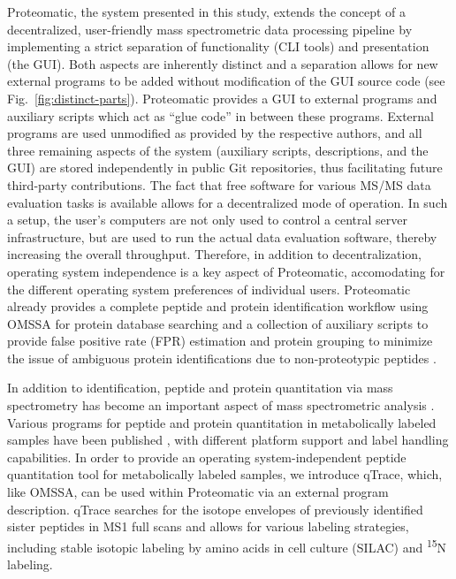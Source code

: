 Proteomatic, the system presented in this study, extends the concept of a 
decentralized, user-friendly mass spectrometric data processing pipeline by 
implementing a strict separation of functionality (CLI tools) and presentation 
(the GUI).
Both aspects are inherently distinct and a separation allows for new external
programs to be added without modification of the GUI source code
(see Fig.~\ref{fig:distinct-parts}).
Proteomatic provides a GUI to external programs and auxiliary scripts which act
as ``glue code'' in between these programs.
External programs are used unmodified as provided by the respective authors,
and all three remaining aspects of the system (auxiliary scripts, descriptions, 
and the GUI) are stored independently in public Git repositories, thus 
facilitating future third-party contributions.
The fact that free software for various MS/MS data evaluation tasks is 
available allows for a decentralized mode of operation.
In such a setup, the user's computers are not only used to control a central 
server infrastructure, but are used to run the actual data evaluation software,
thereby increasing the overall throughput.
Therefore, in addition to decentralization, operating system independence is a 
key aspect of Proteomatic, accomodating for the different operating system 
preferences of individual users.
Proteomatic already provides a complete peptide and protein identification workflow
using OMSSA for protein database searching and a collection of auxiliary scripts
to provide false positive rate (FPR) estimation \cite[]{elias_target-decoy_2007}
and protein grouping to minimize the issue of ambiguous protein identifications
due to non-proteotypic peptides \cite[]{nesvizhskii_interpretation_2005}.

In addition to identification, peptide and protein quantitation via mass 
spectrometry has become an important aspect of mass spectrometric analysis 
\cite[]{kline_protein_2010, schulze_quantitation_2010}. 
Various programs for peptide and protein quantitation in metabolically labeled 
samples have been published \cite[]{han_quantitative_2001, li_automated_2003,
saito_ayums:_2007, park_quantitative_2008, cox_maxquant_2008, 
mortensen_msquant_2010}, with different platform support and label handling 
capabilities. 
In order to provide an operating system-independent peptide quantitation tool
for metabolically labeled samples, we introduce qTrace, which, like OMSSA, can be 
used within Proteomatic via an external program description.
qTrace searches for the isotope envelopes of previously identified sister 
peptides in MS1 full scans and allows for various labeling strategies, 
including stable isotopic labeling by amino acids in cell culture (SILAC) 
and \textsuperscript{15}N labeling.

